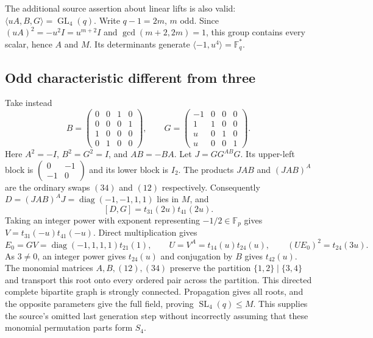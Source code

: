 \documentclass[11pt]{article}
\newcommand{\GL}{\operatorname{GL}}\newcommand{\SL}{\operatorname{SL}}
\newcommand{\diag}{\operatorname{diag}}\newcommand{\F}{\mathbb F}
\begin{document}
The additional source assertion about linear lifts is also valid:
$\langle uA,B,G\rangle=\GL_4(q)$. Write $q-1=2m$, $m$ odd.
Since $(uA)^2=-u^2I=u^{m+2}I$ and
$\gcd(m+2,2m)=1$, this group contains every scalar, hence $A$ and $M$.
Its determinants generate $\langle-1,u^4\rangle=\F_q^*$.

\subsection{Odd characteristic different from three}
Take instead
\[
 B=\begin{pmatrix}0&0&1&0\\0&0&0&1\\1&0&0&0\\0&1&0&0\end{pmatrix},
 \qquad
 G=\begin{pmatrix}-1&0&0&0\\1&1&0&0\\u&0&1&0\\u&0&0&1\end{pmatrix}.
\]
Here $A^2=-I$, $B^2=G^2=I$, and $AB=-BA$. Let $J=GG^{AB}G$.
Its upper-left block is
$\left(\begin{smallmatrix}0&-1\\-1&0\end{smallmatrix}\right)$ and its
lower block is $I_2$. The products
$JAB$ and $(JAB)^A$ are the ordinary swaps $(34)$ and $(12)$ respectively.
Consequently $D=(JAB)^AJ=\diag(-1,-1,1,1)$ lies in $M$, and
\[
 [D,G]=t_{31}(2u)t_{41}(2u).
\]
Taking an integer power with exponent representing $-1/2\in\F_p$ gives
$V=t_{31}(-u)t_{41}(-u)$. Direct multiplication gives
\[
 E_0=GV=\diag(-1,1,1,1)t_{21}(1),\qquad
 U=V^A=t_{14}(u)t_{24}(u),\qquad
 (UE_0)^2=t_{24}(3u).
\]
As $3\ne0$, an integer power gives $t_{24}(u)$ and conjugation by $B$
gives $t_{42}(u)$. The monomial matrices $A,B,(12),(34)$ preserve the
partition $\{1,2\}\mid\{3,4\}$ and transport this root onto every
ordered pair across the partition. This directed complete bipartite
graph is strongly connected. Propagation gives all roots, and the
opposite parameters give the full field, proving $\SL_4(q)\leq M$.
This supplies the source's omitted last generation step without
incorrectly assuming that these monomial permutation parts form $S_4$.
\end{document}
